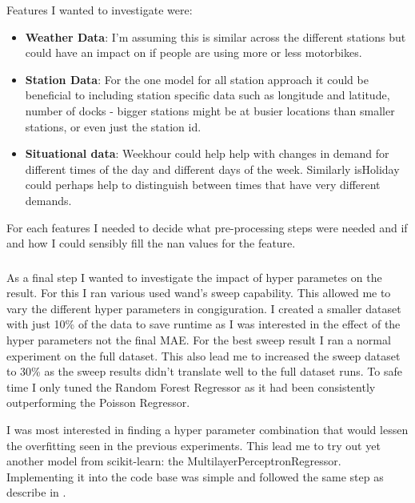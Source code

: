 \documentclass[a4paper]{article}
\begin{document}
    Features I wanted to investigate were:
    \begin{itemize}
        \item \textbf{Weather Data}: I'm assuming this is similar across the different stations but could have an impact on
        if people are using more or less motorbikes.
        \item \textbf{Station Data}: For the one model for all station approach it could be beneficial to including station specific data such as longitude
        and latitude, number of docks - bigger stations might be at busier locations than smaller stations, or even just the station id.
        \item \textbf{Situational data}: Weekhour could help help with changes in demand for different times of the day and different days of the week.
        Similarly isHoliday could perhaps help to distinguish between times that have very different demands.
    \end{itemize}

    For each features I needed to decide what pre-processing steps were needed and if and how I could sensibly fill the nan values
    for the feature.

    \subsubsection*{}
    As a final step  I wanted to investigate the impact of hyper parametes on the result. For this I
    ran various used wand's sweep capability. This allowed me to vary the different hyper parameters in congiguration.
    I created a smaller dataset with just 10\% of the data to save runtime as I was interested in the effect of the hyper parameters not
    the final MAE. For the best sweep result I ran a normal experiment on the full dataset. This also lead me to increased
    the sweep dataset to 30\% as the sweep results didn't translate well to the full dataset runs.
    To safe time I only tuned the Random Forest Regressor as it had been consistently outperforming the Poisson Regressor.

    I was most interested in finding a hyper parameter combination that would lessen the overfitting seen in the previous
    experiments. This lead me to try out yet another model from scikit-learn: the MultilayerPerceptronRegressor. Implementing
    it into the code base was simple and followed the same step as describe in .
\end{document}
